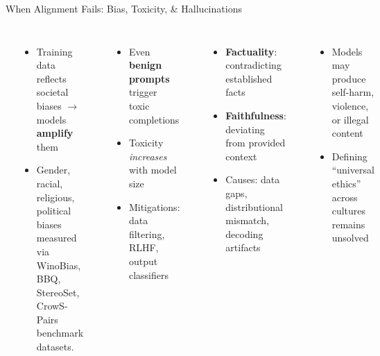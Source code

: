\begin{frame}{When Alignment Fails: Bias, Toxicity, \& Hallucinations}
  \begin{columns}[T]
    {\small\bfseries{}}
    \begin{itemize}\footnotesize\setlength\itemsep{3pt}
      \item Training data reflects societal biases $\to$ models \textbf{amplify} them
      \item Gender, racial, religious, political biases measured via
        WinoBias, BBQ, StereoSet, CrowS-Pairs benchmark datasets.
    \end{itemize}
    \vspace{0.3em}
    {\small\bfseries{}}
    \begin{itemize}\footnotesize\setlength\itemsep{3pt}
      \item Even \textbf{benign prompts} trigger toxic completions
      \item Toxicity \emph{increases} with model size
      \item Mitigations: data filtering, RLHF, output classifiers
    \end{itemize}

    {\small\bfseries{}}
    \begin{itemize}\footnotesize\setlength\itemsep{3pt}
      \item \textbf{Factuality}: contradicting established facts
      \item \textbf{Faithfulness}: deviating from provided context
      \item Causes: data gaps, distributional mismatch, decoding artifacts
    \end{itemize}
    \vspace{0.3em}
    {\small\bfseries{}}
    \begin{itemize}\footnotesize\setlength\itemsep{3pt}
      \item Models may produce self-harm, violence, or illegal content
      \item Defining ``universal ethics'' across cultures remains unsolved
    \end{itemize}
  \end{columns}
\end{frame}


